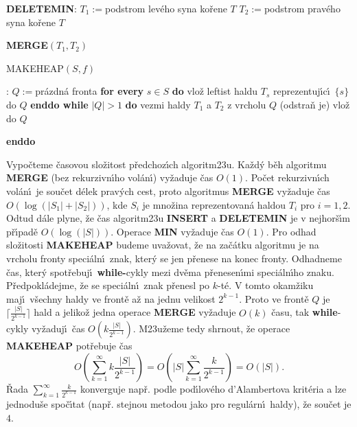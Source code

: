 \documentclass[a4paper,12pt]{article}
\begin{document}
{\bf DELETEMIN}:\newline 
$T_1:=$podstrom lev\'eho syna ko\v rene $T$\newline 
$T_2:=$podstrom prav\'eho syna ko\v rene $T$\newline 
{\bf MERGE$(T_1,T_2)$
\bigskip

MAKEHEAP$(S,f)$}:\newline 
$Q:=$pr\'azdn\'a fronta\newline 
{\bf for every} $s\in S$ {\bf do\newline 
\phantom{{\rm ---}}}vlo\v z leftist haldu $T_s$ reprezentuj\'\i c\'\i\ $
\{s\}$ do $Q$\newline 
{\bf enddo\newline 
while} $|Q|>1$ {\bf do\newline 
\phantom{{\rm ---}}}vezmi haldy $T_1$ a $T_2$ z vrcholu $Q$ 
(odstra\v n je)\newline 
\phantom{---}{\bf MERGE$(T_1,T_2)$} vlo\v z do $Q$\newline 
{\bf enddo
\bigskip


}\flushpar Vypo\v cteme \v casovou slo\v zitost p\v redchoz\'\i ch 
algoritm\accent23u. Ka\v zd\'y b\v eh 
algoritmu {\bf MERGE} (bez rekurzivn\'\i ho vol\'an\'\i ) vy\v zaduje \v cas 
$O(1)$. Po\v cet rekurzivn\'\i ch vol\'an\'\i\ je sou\v cet d\'elek prav\'ych 
cest, proto algoritmus {\bf MERGE} vy\v zaduje \v cas $O(\log(|S_
1|+|S_2|))$, 
kde $S_i$ je mno\v zina reprezentovan\'a haldou $T_i$ pro $i=1,2$.
Odtud d\'ale plyne, \v ze \v cas algoritm\accent23u {\bf INSERT} a 
{\bf DELETE\-MIN} je v 
nejhor\v s\'\i m p\v r\'\i pad\v e $O(\log(|S|))$. Operace {\bf MIN} vy\v zaduje 
\v cas $O(1)$. Pro odhad slo\v zitosti {\bf MA\-KEHEAP} budeme 
uva\v zovat, \v ze na za\v c\'atku algoritmu je na vrcholu fronty 
speci\'aln\'\i\ znak, kter\'y se jen p\v renese na konec fronty. 
Odhadneme \v cas, kter\'y spot\v rebuj\'\i\ {\bf while-}cykly mezi dv\v e\-ma 
p\v renesen\'\i mi speci\'aln\'\i ho znaku. P\v redpokl\'adejme, \v ze se 
spe\-ci\'al\-n\'\i\ znak p\v renesl po $k$-t\'e. V tomto okam\v ziku 
maj\'\i\ v\v sechny haldy ve front\v e a\v z na jednu velikost $2^{
k-1}$. 
Proto ve front\v e $Q$ je $\big\lceil \frac {|S|}{2^{k-1}}\big\rceil $ hald a jeliko\v z jedna operace 
{\bf MERGE} vy\v zadu\-je $O(k)$ \v casu, tak {\bf while}-cykly vy\v zaduj\'\i\ 
\v cas $O(k\frac {|S|}{2^{k-1}})$. M\accent23u\v zeme tedy shrnout, \v ze operace 
{\bf MAKEHEAP} pot\v rebuje \v cas 
$$O(\sum_{k=1}^{\infty}k\frac {|S|}{2^{k-1}})=O(|S|\sum_{k=1}^{\infty}\frac 
k{2^{k-1}})=O(|S|).$$
\v Rada $\sum_{k=1}^{\infty}$$\frac k{2^{k-1}}$ konverguje nap\v r. podle pod\'\i lov\'eho d'Alambertova 
krit\'eria a lze jednodu\v se spo\v c\'\i tat (nap\v r. stejnou metodou 
jako pro regul\'arn\'\i\ haldy), \v ze sou\v cet je $4$.
\medskip
\end{document}
